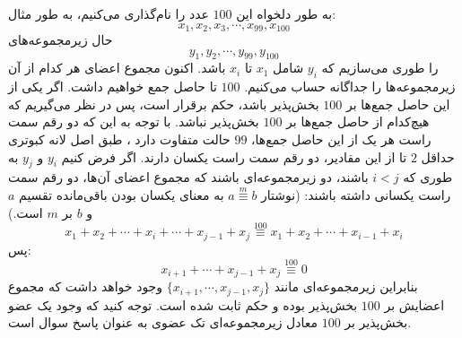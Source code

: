 \p
به طور دلخواه این 
$100$
 عدد را نام‌گذاری می‌کنیم، به طور مثال:
$$x_1, x_2, x_3, \cdots, x_{99}, x_{100}$$
 حال زیرمجموعه‌های 
$$y_1, y_2, \cdots, y_{99}, y_{100}$$
 را طوری می‌سازیم که 
$y_i$
 شامل 
$x_1$
 تا
$x_i$
 باشد. اکنون مجموع اعضای هر کدام از آن زیرمجموعه‌ها را جداگانه حساب می‌کنیم.
 $100$
 تا حاصل جمع خواهیم داشت. اگر یکی از این حاصل جمع‌ها بر 
 $100$
 بخش‌پذیر باشد، حکم برقرار است، پس در نظر می‌گیریم که هیچ‌کدام از حاصل جمع‌ها بر 
 $100$
 بخش‌پذیر نباشد. با توجه به این که دو رقم سمت راست هر یک از این حاصل جمع‌ها،
 $99$
حالت متفاوت دارد ، طبق اصل لانه کبوتری حداقل 
$2$
 تا از این مقادیر، دو رقم سمت راست یکسان دارند. اگر فرض کنیم
 $y_i$
 و
 $y_j$
 به طوری که
 $i < j$
باشند، دو زیرمجموعه‌ای باشند که مجموع اعضای آن‌ها، دو رقم سمت راست یکسانی داشته باشند: (نوشتار
$a\overset{m}{\equiv}b$
به معنای یکسان بودن  باقی‌مانده تقسیم 
$a$
و
$b$
بر
$m$
است.)
  $$x_1 + x_2 + \cdots + x_i + \cdots + x_{j-1} + x_j\overset{100}{\equiv} x_1 + x_2 + \cdots + x_{i-1} + x_i$$
 پس:
 $$x_{i+1} + \cdots + x_{j-1} + x_j \overset{100}{\equiv} 0$$
 \p
 بنابراین زیرمجموعه‌ای مانند
 $\{x_{i+1}, \cdots, x_{j-1}, x_j\}$
 وجود خواهد داشت که مجموع اعضایش بر
 $100$
 بخش‌پذیر بوده و حکم ثابت شده است. توجه کنید که وجود یک عضو بخش‌پذیر بر
$100$ 
معادل زیرمجموعه‌ای تک عضوی به عنوان پاسخ سوال است.
 
 
